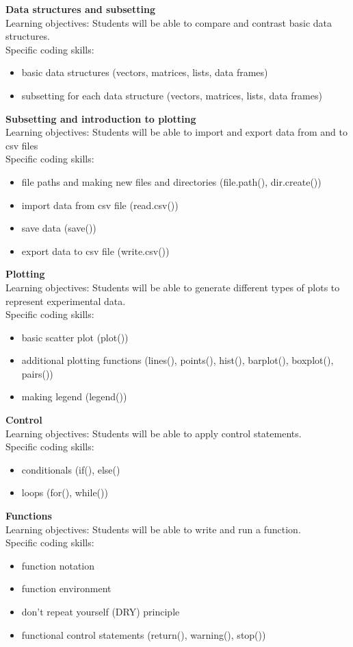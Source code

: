 \documentclass[paper=a4, fontsize=11pt]{scrartcl} %
\numberwithin{equation}{section} %
\numberwithin{figure}{section} %
\numberwithin{table}{section} %
\begin{document}
\textbf{Data structures and subsetting} \\
Learning objectives:  Students will be able to compare and contrast basic data structures. \\
Specific coding skills:
\begin{itemize}
	\item{basic data structures (vectors, matrices, lists, data frames)}
	\item{subsetting for each data structure (vectors, matrices, lists, data frames)}
\end{itemize}  

\textbf{Subsetting and introduction to plotting} \\
Learning objectives: Students will be able to import and export data from and to csv files \\
Specific coding skills:
\begin{itemize}
	\item{file paths and making new files and directories (file.path(), dir.create())}
	\item{import data from csv file (read.csv())}
	\item{save data (save())}
	\item{export data to csv file (write.csv())}
\end{itemize}  

\textbf{Plotting} \\
Learning objectives: Students will be able to generate different types of plots to represent experimental data. \\
Specific coding skills:
\begin{itemize}
	\item{basic scatter plot (plot())}
	\item{additional plotting functions (lines(), points(), hist(), barplot(), boxplot(), pairs())}
	\item{making legend (legend())}
\end{itemize}  

\textbf{Control} \\
Learning objectives: Students will be able to apply control statements. \\
Specific coding skills:
\begin{itemize}
	\item{conditionals (if(), else()}
	\item{loops (for(), while())}
\end{itemize}  

\textbf{Functions} \\
Learning objectives: Students will be able to write and run a function. \\
Specific coding skills:
\begin{itemize}
	\item{function notation}
	\item{function environment}
	\item{don't repeat yourself (DRY) principle}
	\item{functional control statements (return(), warning(), stop())}
\end{itemize}  
\end{document}
